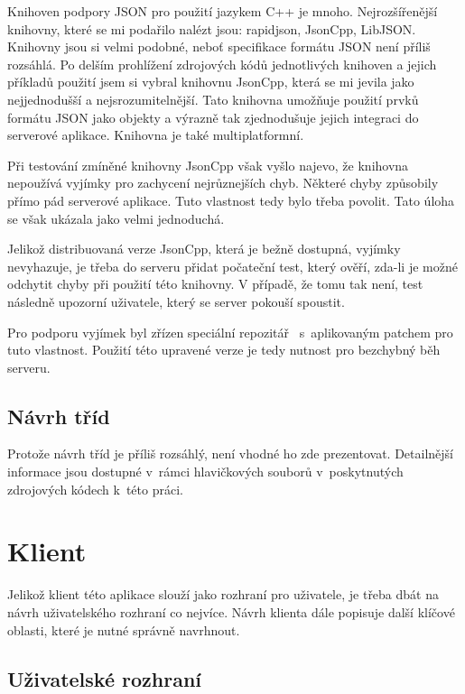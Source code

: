 \documentclass[thesis=B,czech]{FITthesis}[2013/10/20]
\begin{document}
Knihoven podpory JSON pro použití jazykem C++ je mnoho. Nejrozšířenější knihovny, které se mi podařilo nalézt jsou: rapidjson, JsonCpp, LibJSON. Knihovny jsou si velmi podobné, neboť specifikace formátu JSON není příliš rozsáhlá. Po delším prohlížení zdrojových kódů jednotlivých knihoven a jejich příkladů použití jsem si vybral knihovnu JsonCpp, která se mi jevila jako nejjednodušší a nejsrozumitelnější. Tato knihovna umožňuje použití prvků formátu JSON jako objekty a výrazně tak zjednodušuje jejich integraci do serverové aplikace. Knihovna je také multiplatformní.

Při testování zmíněné knihovny JsonCpp však vyšlo najevo, že knihovna nepoužívá vyjímky pro zachycení nejrůznejších chyb. Některé chyby způsobily přímo pád serverové aplikace. Tuto vlastnost tedy bylo třeba povolit. Tato úloha se však ukázala jako velmi jednoduchá.

Jelikož distribuovaná verze JsonCpp, která je bežně dostupná, vyjímky nevyhazuje, je třeba do serveru přidat počateční test, který ověří, zda-li je možné odchytit chyby při použití této knihovny. V případě, že tomu tak není, test následně upozorní uživatele, který se server pokouší spoustit.

Pro podporu vyjímek byl zřízen speciální repozitář~\cite{json_ex_repo} s~aplikovaným patchem pro tuto vlastnost. Použití této upravené verze je tedy nutnost pro bezchybný běh serveru.

\subsection{Návrh tříd}

Protože návrh tříd je příliš rozsáhlý, není vhodné ho zde prezentovat. Detailnější informace jsou dostupné v~rámci hlavičkových souborů v~poskytnutých zdrojových kódech k~této práci.

\section{Klient}

Jelikož klient této aplikace slouží jako rozhraní pro uživatele, je třeba dbát na návrh uživatelského rozhraní co nejvíce. Návrh klienta dále popisuje další klíčové oblasti, které je nutné správně navrhnout.

\subsection{Uživatelské rozhraní}
\end{document}
